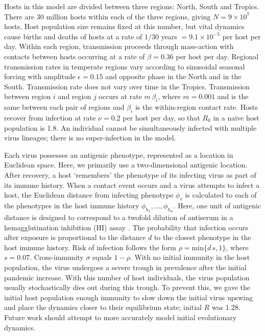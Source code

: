 \documentclass[11pt,oneside,letterpaper]{article}
\begin{document}
Hosts in this model are divided between three regions: North, South and Tropics.  There are 30 million hosts within each of the three regions, giving $N = 9 \times 10^{7}$ hosts.  Host population size remains fixed at this number, but vital dynamics cause births and deaths of hosts at a rate of $1 / 30$ years $= 9.1 \times 10^{-5}$ per host per day.  Within each region, transmission proceeds through mass-action with contacts between hosts occurring at a rate of $\beta = 0.36$ per host per day.  Regional transmission rates in temperate regions vary according to sinusoidal seasonal forcing with amplitude $\epsilon = 0.15$ and opposite phase in the North and in the South.  Transmission rate does not vary over time in the Tropics.  Transmission between region $i$ and region $j$ occurs at rate $m\,\beta_i$, where $m=0.001$ and is the same between each pair of regions and $\beta_i$ is the within-region contact rate.   Hosts recover from infection at rate $\nu = 0.2$ per host per day, so that $R_0$ in a naive host population is 1.8.  An individual cannot be simultaneously infected with multiple virus lineages; there is no super-infection in the model.

Each virus possesses an antigenic phenotype, represented as a location in Euclidean space.  Here, we primarily use a two-dimensional antigenic location.  After recovery, a host `remembers' the phenotype of its infecting virus as part of its immune history.  When a contact event occurs and a virus attempts to infect a host, the Euclidean distance from infecting phenotype $\phi_v$ is calculated to each of the phenotypes in the host immune history $\phi_{h_1}, \dots, \phi_{h_n}$.  Here, one unit of antigenic distance is designed to correspond to a twofold dilution of antiserum in a hemagglutination inhibition (HI) assay \cite{Smith04}. The probability that infection occurs after exposure is proportional to the distance $d$ to the closest phenotype in the host immune history.  Risk of infection follows the form $\rho = \mathrm{min}\{d\,s,1\}$, where $s=0.07$.  Cross-immunity $\sigma$ equals $1-\rho$.  With no initial immunity in the host population, the virus undergoes a severe trough in prevalence after the initial pandemic increase.  With this number of host individuals, the virus population usually stochastically dies out during this trough.  To prevent this, we gave the initial host population enough immunity to slow down the initial virus upswing and place the dynamics closer to their equilibrium state; initial $R$ was 1.28.  Future work should attempt to more accurately model initial evolutionary dynamics.
\end{document}
